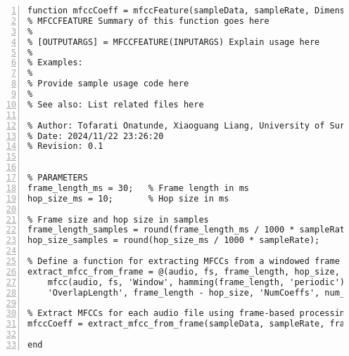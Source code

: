 \documentclass{article}
\begin{document}
\begin{lstlisting}[frame=single, numbers=left, style=Matlab-editor, caption={mfccFeature.m}, label={lst:mfccFeature}]
  function mfccCoeff = mfccFeature(sampleData, sampleRate, Dimension)
% MFCCFEATURE Summary of this function goes here
%
% [OUTPUTARGS] = MFCCFEATURE(INPUTARGS) Explain usage here
%
% Examples:
%
% Provide sample usage code here
%
% See also: List related files here

% Author: Tofarati Onatunde, Xiaoguang Liang, University of Surrey
% Date: 2024/11/22 23:26:20
% Revision: 0.1


% PARAMETERS
frame_length_ms = 30;   % Frame length in ms
hop_size_ms = 10;       % Hop size in ms

% Frame size and hop size in samples
frame_length_samples = round(frame_length_ms / 1000 * sampleRate);  % Convert ms to samples
hop_size_samples = round(hop_size_ms / 1000 * sampleRate);        % Convert ms to samples

% Define a function for extracting MFCCs from a windowed frame
extract_mfcc_from_frame = @(audio, fs, frame_length, hop_size, num_coeffs) ...
    mfcc(audio, fs, 'Window', hamming(frame_length, 'periodic'), ...
    'OverlapLength', frame_length - hop_size, 'NumCoeffs', num_coeffs, 'LogEnergy', 'replace');

% Extract MFCCs for each audio file using frame-based processing
mfccCoeff = extract_mfcc_from_frame(sampleData, sampleRate, frame_length_samples, hop_size_samples, Dimension);

end

\end{lstlisting}
\end{document}
